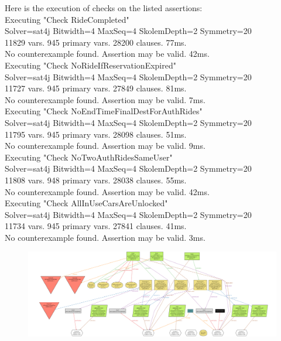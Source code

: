 
\vfill
Here is the execution of checks on the listed assertions:\\

Executing "Check RideCompleted"\\
Solver=sat4j Bitwidth=4 MaxSeq=4 SkolemDepth=2 Symmetry=20\\
11829 vars. 945 primary vars. 28200 clauses. 77ms.\\
No counterexample found. Assertion may be valid. 42ms.\\

Executing "Check NoRideIfReservationExpired"\\
Solver=sat4j Bitwidth=4 MaxSeq=4 SkolemDepth=2 Symmetry=20\\
11727 vars. 945 primary vars. 27849 clauses. 81ms.\\
No counterexample found. Assertion may be valid. 7ms.\\

Executing "Check NoEndTimeFinalDestForAuthRides"\\
Solver=sat4j Bitwidth=4 MaxSeq=4 SkolemDepth=2 Symmetry=20\\
11795 vars. 945 primary vars. 28098 clauses. 51ms.\\
No counterexample found. Assertion may be valid. 9ms.\\

Executing "Check NoTwoAuthRidesSameUser"\\
Solver=sat4j Bitwidth=4 MaxSeq=4 SkolemDepth=2 Symmetry=20\\
11808 vars. 948 primary vars. 28038 clauses. 55ms.\\
No counterexample found. Assertion may be valid. 42ms.\\

Executing "Check AllInUseCarsAreUnlocked"\\
Solver=sat4j Bitwidth=4 MaxSeq=4 SkolemDepth=2 Symmetry=20\\
11734 vars. 945 primary vars. 27841 clauses. 41ms.\\
No counterexample found. Assertion may be valid. 3ms.\\

\begin{figure}[H]
\begin{center}
		\vspace*{-150pt}
		\includegraphics[width=885pt, angle= 90]{./pictures/alloy_model_diagram.png}
		\label{class_diagram}
\end{center}
\end{figure}

